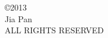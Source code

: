 \begin{center}
\begin{singlespace}
\copyright 2013\\
Jia Pan \\
ALL RIGHTS RESERVED
\end{singlespace}
\end{center}

\vspace{2in}
